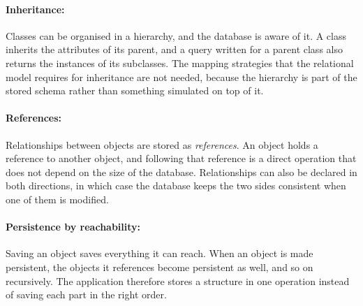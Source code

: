 \documentclass{article}
\begin{document}
\paragraph{Inheritance:} Classes can be organised in a hierarchy, and the
database is aware of it. A class inherits the attributes of its parent, and a
query written for a parent class also returns the instances of its subclasses.
The mapping strategies that the relational model requires for inheritance are not
needed, because the hierarchy is part of the stored schema rather than something
simulated on top of it.

\paragraph{References:} Relationships between objects are stored as
\emph{references}. An object holds a reference to another object, and following
that reference is a direct operation that does not depend on the size of the
database. Relationships can also be declared in both directions, in which case
the database keeps the two sides consistent when one of them is modified.

\paragraph{Persistence by reachability:} Saving an object saves everything it can
reach. When an object is made persistent, the objects it references become
persistent as well, and so on recursively. The application therefore stores a
structure in one operation instead of saving each part in the right order.
\end{document}
